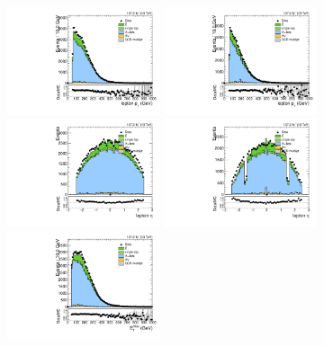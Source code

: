 \begin{figure}[htbp]
  \centering
  \includegraphics[width=0.4\textwidth]{fig/controlPlots/SB_b1_mu_allP_allC_allE_Run2_lnujj_l1_l_pt.pdf}
  \includegraphics[width=0.4\textwidth]{fig/controlPlots/SB_b1_e_allP_allC_allE_Run2_lnujj_l1_l_pt.pdf}\\
  \includegraphics[width=0.4\textwidth]{fig/controlPlots/SB_b1_mu_allP_allC_allE_Run2_lnujj_l1_l_eta.pdf}
  \includegraphics[width=0.4\textwidth]{fig/controlPlots/SB_b1_e_allP_allC_allE_Run2_lnujj_l1_l_eta.pdf}\\
  \includegraphics[width=0.4\textwidth]{fig/controlPlots/SB_b1_mu_allP_allC_allE_Run2_met_pt.pdf}

\end{figure}
